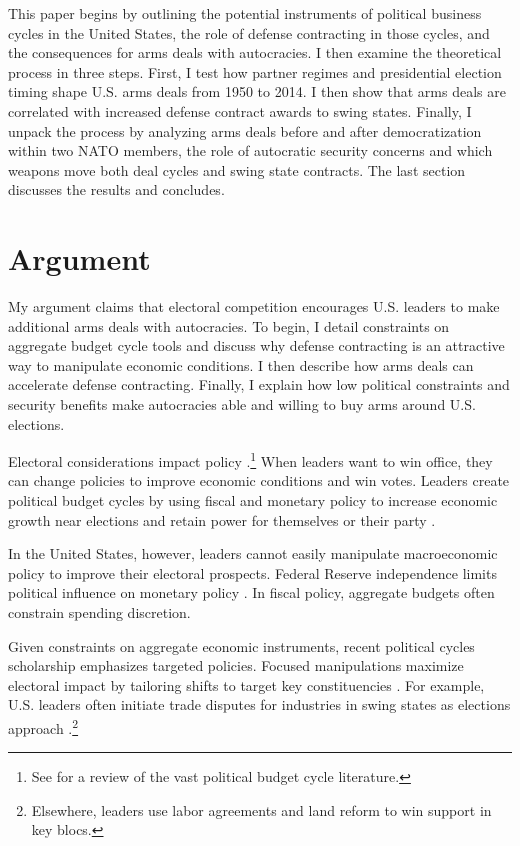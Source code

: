 \documentclass[12pt]{article}
\begin{document}
This paper begins by outlining the potential instruments of political business cycles in the United States, the role of defense contracting in those cycles, and the consequences for arms deals with autocracies. 
I then examine the theoretical process in three steps. 
First, I test how partner regimes and presidential election timing shape U.S. arms deals from 1950 to 2014.
I then show that arms deals are correlated with increased defense contract awards to swing states.
Finally, I unpack the process by analyzing arms deals before and after democratization within two NATO members, the role of autocratic security concerns and which weapons move both deal cycles and swing state contracts.
The last section discusses the results and concludes.


\section{Argument}


My argument claims that electoral competition encourages U.S. leaders to make additional arms deals with autocracies.
To begin, I detail constraints on aggregate budget cycle tools and discuss why defense contracting is an attractive way to manipulate economic conditions.
I then describe how arms deals can accelerate defense contracting. 
Finally, I explain how low political constraints and security benefits make autocracies able and willing to buy arms around U.S. elections.


Electoral considerations impact policy \citep{Nordhaus1975}.\footnote{See \citet{Dubois2016} for a review of the vast political budget cycle literature.} 
When leaders want to win office, they can change policies to improve economic conditions and win votes. 
Leaders create political budget cycles by using fiscal and monetary policy to increase economic growth near elections and retain power for themselves or their party \citep{Tufte1978, Rogoff1987}. 


In the United States, however, leaders cannot easily manipulate macroeconomic policy to improve their electoral prospects.  
Federal Reserve independence limits political influence on monetary policy \citep{ClarkHallerberg2000}. 
In fiscal policy, aggregate budgets often constrain spending discretion.


Given constraints on aggregate economic instruments, recent political cycles scholarship emphasizes targeted policies.
Focused manipulations maximize electoral impact by tailoring shifts to target key constituencies \citep[pg. 248]{Dubois2016}.
For example, U.S. leaders often initiate trade disputes for industries in swing states as elections approach \citep{Conconietal2017}.\footnote{Elsewhere, leaders use labor agreements \citep{Ahlquist2010} and land reform \citep{Philips2020} to win support in key blocs.} 
\end{document}
